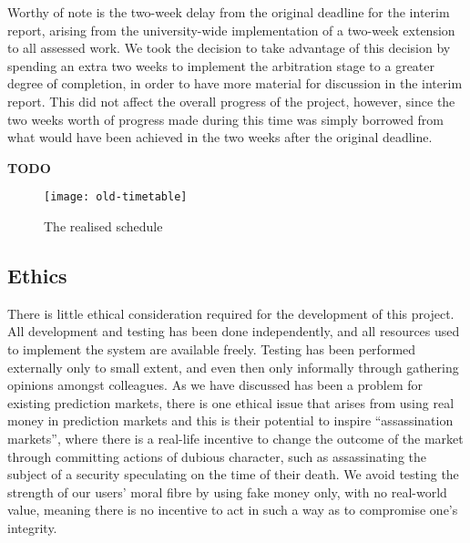 Worthy of note is the two-week delay from the original deadline for the interim
report, arising from the university-wide implementation of a two-week extension
to all assessed work. We took the decision to take advantage of this decision
by spending an extra two weeks to implement the arbitration stage to a greater
degree of completion, in order to have more material for discussion in the
interim report. This did not affect the overall progress of the project,
however, since the two weeks worth of progress made during this time was simply
borrowed from what would have been achieved in the two weeks after the original
deadline.

\textbf{TODO}

\begin{figure}[h]
	\centering
	\texttt{[image: old-timetable]}
	\caption{The realised schedule}
	\label{fig:new-timetable}
\end{figure}

\subsection{Ethics}

There is little ethical consideration required for the development of this
project. All development and testing has been done independently, and all
resources used to implement the system are available freely. Testing has been
performed externally only to small extent, and even then only informally
through gathering opinions amongst colleagues. As we have discussed has been a
problem for existing prediction markets, there is one ethical issue that arises
from using real money in prediction markets and this is their potential to
inspire ``assassination markets'', where there is a real-life incentive to
change the outcome of the market through committing actions of dubious
character, such as assassinating the subject of a security speculating on the
time of their death. We avoid testing the strength of our users' moral fibre by
using fake money only, with no real-world value, meaning there is no incentive
to act in such a way as to compromise one's integrity.

